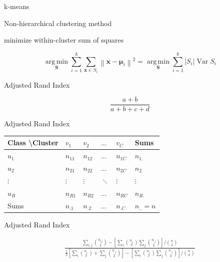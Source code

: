 \documentclass[ignorenonframetext,]{beamer}
\begin{document}
\begin{frame}{k-means}

Non-hierarchical clustering method

minimize within-cluster sum of squares

\[\underset{\mathbf{S}} {\operatorname{arg\,min}}  \sum_{i=1}^{k} \sum_{\mathbf x \in S_i} \left\| \mathbf x - \boldsymbol\mu_i \right\|^2 = \underset{\mathbf{S}} {\operatorname{arg\,min}}  \sum_{i=1}^{k} |S_i| \operatorname{Var} S_i \]

\end{frame}

\begin{frame}{Adjusted Rand Index}

\[\frac{a+b}{a+b+c+d}\]

\end{frame}

\begin{frame}{Adjusted Rand Index}

\begin{table}[h]
\centering
\begin{tabular}{l|llll|l}
Class \textbackslash Cluster & $v_1$    & $v_2$  & $\ldots$ & $v_C$  & Sums      \\ \hline
$u_1$                        & $n_{11}$ & $n_{12}$ & $\ldots$ & $n_{1C}$ & $n_{1.}$     \\
$u_2$                        & $n_{21}$ & $n_{22}$ & $\ldots$ & $n_{2C}$ & $n_{2.}$     \\
$\vdots$                     & $\vdots$ & $\vdots$ & $\ddots$ & $\vdots$ & $\vdots$     \\
$u_R$                        & $n_{R1}$ & $n_{R2}$ & $\ldots$ & $n_{RC}$ & $n_{R.}$     \\ \hline
Sums                         & $n_{.1}$ & $n_{.2}$ & $\ldots$ & $n_{.C}$ & $n_{..} = n$
\end{tabular}
\label{tab:1iY}
\end{table}

\end{frame}

\begin{frame}{Adjusted Rand Index}

\begin{align}
\frac{ 
    \sum_{i,j} \binom{n_{ij}}{2}
    -
    \left[ \sum_i \binom{n_{i.}}{2} \sum_j \binom{n_{.j}}{2} \right] / \binom{n}{2}
 }{
    \frac{1}{2} 
    \left[ 
        \sum_i 
        \binom{n_{i.}}{2}
        +
        \sum_j
        \binom{n_{.j}}{2}
    \right]
    -
    \left[ \sum_i \binom{n_{i.}}{2} \sum_j \binom{n_{.j}}{2} \right] / \binom{n}{2}
}
\label{eq:1ix}
\end{align}

\end{frame}
\end{document}
